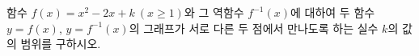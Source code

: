 함수 $f(x)=x^2-2x+k\ (x\ge 1)$와 그 역함수 $f^{-1}(x)$에 대하여 두 함수 $y=f(x)$, $y=f^{-1}(x)$의 그래프가 서로 다른 두 점에서 만나도록 하는 실수 $k$의 값의 범위를 구하시오.

